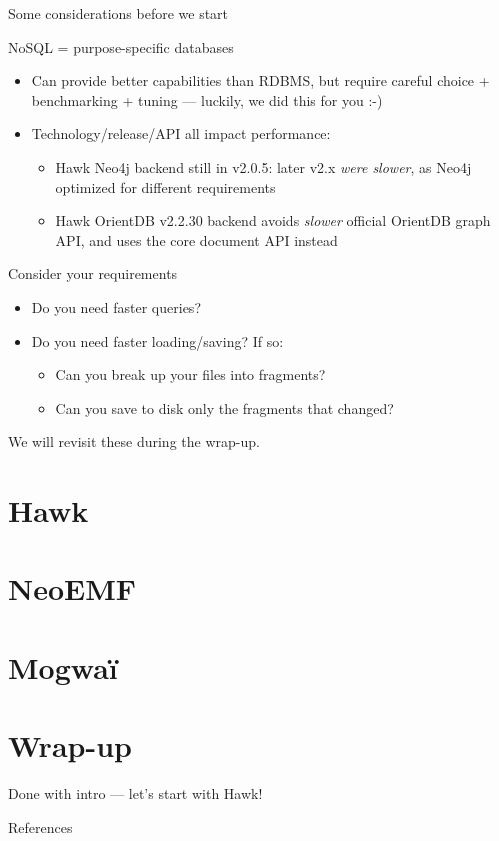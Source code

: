 \begin{frame}{Some considerations before we start}

  \begin{block}{NoSQL = purpose-specific databases}
    \begin{itemize}
    \item Can provide better capabilities than RDBMS, but require careful choice
      + benchmarking + tuning --- luckily, we did this for you :-)
    \item Technology/release/API all impact performance:
      \begin{itemize}
      \item Hawk Neo4j backend still in v2.0.5: later v2.x \emph{were slower},
        as Neo4j optimized for different requirements
      \item Hawk OrientDB v2.2.30 backend avoids \emph{slower} official OrientDB
        graph API, and uses the core document API instead
      \end{itemize}
    \end{itemize}
  \end{block}

  \begin{block}{Consider your requirements}
    \begin{itemize}
    \item Do you need faster queries?
    \item Do you need faster loading/saving? If so:
      \begin{itemize}
      \item Can you break up your files into fragments?
      \item Can you save to disk only the fragments that changed?
      \end{itemize}
    \end{itemize}

    We will revisit these during the wrap-up.
  \end{block}

\end{frame}

\section{Hawk}
\section{NeoEMF}
\section{Mogwa\"i}
\section{Wrap-up}

\appendix

\begin{frame}[standout]
  Done with intro --- let's start with Hawk!
\end{frame}

\begin{frame}{References}

  
  

\end{frame}


